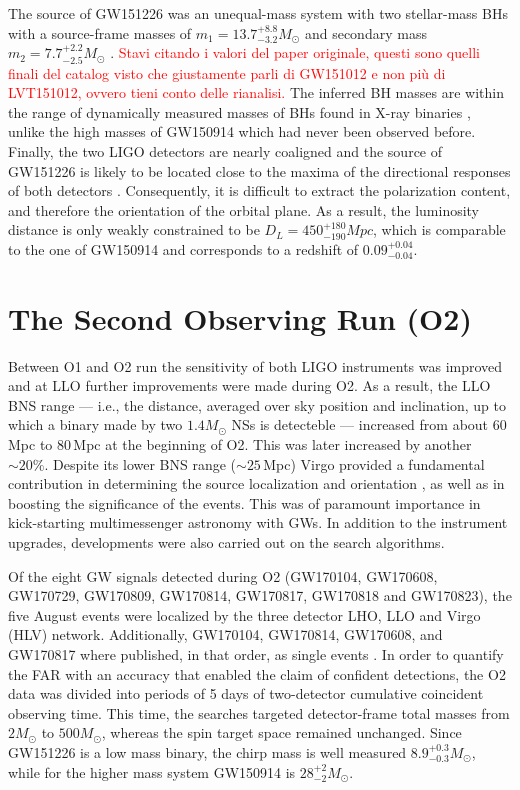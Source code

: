 \documentclass[binding=0.6cm, LaM]{sapthesis}
\newcommand{\fpg}[1]{\textcolor{red}{#1} }
\begin{document}
	The source of GW151226 was an unequal-mass system with two stellar-mass BHs 
	with a source-frame masses of $m_1 = 13.7^{+8.8}_{-3.2}M_\odot$ 
	and secondary mass $m_2 = 7.7^{+2.2}_{-2.5}M_\odot$ \cite{13}. 
	\fpg{Stavi citando i valori del paper originale, questi sono quelli finali del catalog 
	     visto che giustamente parli di GW151012 e non pi\`u di LVT151012, ovvero tieni conto delle rianalisi.} 
	The inferred BH masses are within the range of dynamically measured masses 
	of BHs found in X-ray binaries \cite{128-132}, 
	unlike the high masses of GW150914 which had never been observed before. 
	Finally, the two LIGO detectors are nearly coaligned and the source of GW151226 
	is likely to be located close to the maxima of the directional responses of both detectors \cite{28}. 
	Consequently, it is difficult to extract the polarization content, and therefore the orientation of the orbital plane. 
	As a result, the luminosity distance is only weakly constrained to be $D_L = 450^{+180}_{-190}Mpc$, 
	which is comparable to the one of GW150914 and corresponds to a redshift of $0.09^{+0.04}_{-0.04}$.


\section{The Second Observing Run (O2)}

	Between O1 and O2 run the sensitivity of both LIGO instruments was improved and 
	at LLO further improvements were made during O2. 
	As a result, the LLO BNS range --- i.e., the distance, averaged over sky position and inclination, 
	up to which a binary made by two $1.4M_\odot$ NSs is detecteble --- 
	increased from about 60\,Mpc to 80\,Mpc at the beginning of O2.  
	This was later increased by another $\sim 20\%$.
 	Despite its lower BNS range ($\sim 25\,$Mpc) Virgo provided a fundamental contribution 
	in determining the source localization and orientation \cite{56}, 
	as well as in boosting the significance of the events. 
	This was of paramount importance in kick-starting multimessenger astronomy with GWs.
	In addition to the instrument upgrades, developments were also carried out on
	the search algorithms.
 
	Of the eight GW signals detected during O2 
	(GW170104, GW170608, GW170729, GW170809, GW170814, GW170817, GW170818 and GW170823), 
	the five August events were localized by the three detector LHO, LLO and Virgo (HLV) network.  
	Additionally, GW170104, GW170814, GW170608, and GW170817 where published, 
	in that order, as single events \cite{60,61,62,138}.   
	In order to quantify the FAR with an accuracy that enabled the claim of confident detections, 
	the O2 data was divided into periods of 5 days of two-detector cumulative coincident observing time.
	This time, the searches targeted  detector-frame total masses from $2M_\odot$ to $500 M_\odot$, 
	whereas the spin target space remained unchanged.
	Since GW151226 is a low mass binary, the chirp  mass is well measured $8.9^{+0.3}_{-0.3} M_\odot$,
	while for the higher mass system GW150914 is $28^{+2}_{-2}M_\odot$.
\end{document}
